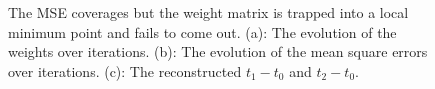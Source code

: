\begin{figure}
\centering
{}
\caption{The MSE coverages but the weight matrix is trapped into a local minimum point and fails to come out.
(a): The evolution of the weights over iterations.
(b): The evolution of the mean square errors over iterations.
(c): The reconstructed $t_1-t_0$ and $t_2-t_0$.}
\label{local_minimum}
\end{figure}

